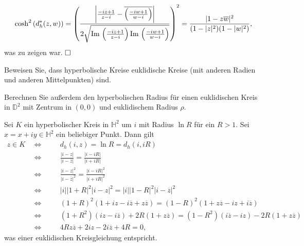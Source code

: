 \documentclass[11pt]{book}
\numberwithin{dummy}{section}
\theoremstyle{nonumberbreak}
\newenvironment{prob}[1][]{\ifthenelse{\equal{#1}{}}{\problem}{\problem[#1]}\rm}{\endproblem}
\newenvironment{sol}[1][]{\ifthenelse{\equal{#1}{}}{\solution}{\solution[#1]}\rm}{\endsolution}
\newcommand{\Imm}{\mathrm{Im}\hspace{1.5pt}}
\newcommand{\He}{\mathbb{H}}
\newcommand{\D}{\mathbb{D}}
\begin{document}
\begin{spacing}{1.4}
\begin{prob}
\begin{sol}
\begin{compactenum}
\begin{compactenum}
$$ \cosh^2 \left( d_h^*(z,w)\right) =  \left( \frac{ \bigg \vert \frac{-iz+1}{z-i} - \overline{\left( \frac{-iw+1}{w-i}\right)} \bigg\vert }{2 \sqrt{ \Imm \left( \frac{-iz+1}{z-i}\right) \Imm\left( \frac{-iw+1}{w-i}\right)}}\right)^2 =  \frac{\vert 1 - z \overline{w}\vert^2}{(1-\vert z \vert^2)(1-\vert w \vert ^2)},$$
was zu zeigen war. $\hfill \Box$
\end{compactenum}

\end{compactenum}

\end{sol}

\end{prob}


\begin{prob}   %
\begin{compactenum}
\item Beweisen Sie, dass hyperbolische Kreise euklidische Kreise (mit anderen Radien und anderen Mittelpunkten) sind.
\item Berechnen Sie außerdem den hyperbolischen Radius für einen euklidischen Kreis in $\D^2$ mit Zentrum in $(0,0)$ und euklidischem Radius $\rho$.
\end{compactenum}

\begin{sol}
\begin{compactenum}
\item Sei $K$ ein hyperbolischer Kreis in $\He^2$ um $i$ mit Radius $\ln R$ für ein $R >1$. Sei $x=x+iy\in \He^2$ ein beliebiger Punkt. Dann gilt
\begin{alignat*}{5}
z \in K \ \ &\Longleftrightarrow && \quad d_h(i,z) = \ln R = d_h(i,iR) \\
&\Longleftrightarrow && \quad \frac{\vert i-z\vert}{\vert i - \overline{z}\vert} = \frac{\vert i - iR\vert}{\vert i + i R
\vert}\\
&\Longleftrightarrow && \quad  \frac{\vert i-z\vert^2}{\vert i - \overline{z}\vert^2} = \frac{\vert i - iR\vert^2}{\vert i + i R \vert^2} \\
&\Longleftrightarrow && \quad \vert i \vert \vert 1 + R\vert^2 \vert i -z \vert^2 = \vert i \vert \vert 1-R \vert^2 \vert i - \overline{z}\vert^2\\
&\Longleftrightarrow && \quad (1+R)^2 (1+iz-i\overline{z} + z\overline{z}) = (1-R)^2(1+z\overline{z} - iz + i \overline{z})\\
&\Longleftrightarrow && \quad (1+R^2)(iz - i \overline{z}) + 2R ( 1+ z \overline{z}) = (1-R^2)(i\overline{z} -iz) -2R(1 + z \overline{z}) \\
&\Longleftrightarrow && \quad 4R z \overline{z} + 2iz -2i \overline{z} + 4R = 0,
\end{alignat*}
was einer euklidischen Kreisgleichung entspricht.


\end{compactenum}
\end{sol}
\end{prob}
\end{spacing}
\end{document}
